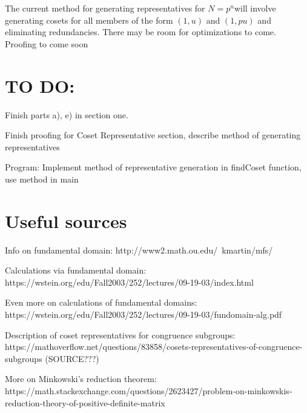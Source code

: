 \documentclass[11pt, oneside]{article}   	%
\begin{document}
The current method for generating representatives for $N=p^n$will involve generating cosets for all members of the form $(1,u)$ and $(1,pu)$ and eliminating redundancies. There may be room for optimizations to come. Proofing to come soon

\section*{TO DO:}

Finish parts a), e) in section one.

Finish proofing for Coset Representative section, describe method of generating representatives

Program: Implement method of representative generation in findCoset function, use method in main

\section*{Useful sources}

Info on fundamental domain: http://www2.math.ou.edu/~kmartin/mfs/

Calculations via fundamental domain: https://wstein.org/edu/Fall2003/252/lectures/09-19-03/index.html

Even more on calculations of fundamental domains: https://wstein.org/edu/Fall2003/252/lectures/09-19-03/fundomain-alg.pdf

Description of coset representatives for congruence subgroups: https://mathoverflow.net/questions/83858/cosets-representatives-of-congruence-subgroups (SOURCE???)

More on Minkowski's reduction theorem: https://math.stackexchange.com/questions/2623427/problem-on-minkowskis-reduction-theory-of-positive-definite-matrix
\end{document}
